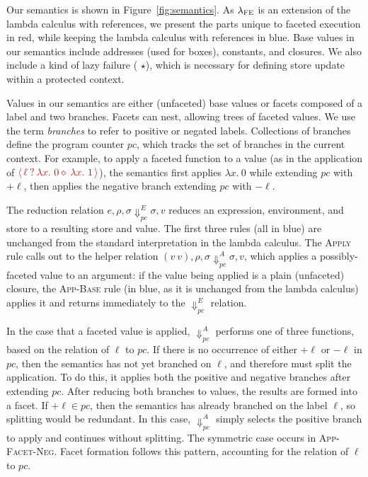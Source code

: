 \documentclass[review=true,acmlarge]{acmart}
\newcommand{\colorMATH}{black!20!blue}
\newcommand{\colorFAC}{black!20!red}
\newcommand{\blue}[1] {{\color{\colorMATH} #1}}
\newcommand{\fcol}[1] {{\color{\colorFAC} #1}}
\newcommand{\bmth}[1] {{\color{\colorMATH} $#1$}}
\newcommand{\rmth}[1] {{\color{\colorFAC} $#1$}}
\newcommand{\lang}[0]{$\lambda_\textsc{FE}$\xspace}
\newcommand{\facet}[3]{{\fcol{\ensuremath{\langle \, {#1} \: ? \: {#2} \diamond \: {#3} \, \rangle}}}}
\begin{document}
Our semantics is shown in Figure~\ref{fig:semantics}. As \lang is an
extension of the lambda calculus with references, we present the parts
unique to faceted execution in \fcol{red}, while keeping the lambda
calculus with references in \blue{blue}. Base values in our semantics
include addresses (used for boxes), constants, and closures. We also
include a kind of lazy failure (\bmth{\star}), which is necessary for
defining store update within a protected context.

Values in our semantics are either (unfaceted) base values or facets
composed of a label and two branches. Facets can nest, allowing trees
of faceted values. We use the term \emph{branches} to refer to
positive or negated labels. Collections of branches define the program
counter \rmth{pc}, which tracks the set of branches in the current
context. For example, to apply a faceted function to a value (as in
the application of \bmth{\facet{\ell}{\lambda x.~0}{\lambda x.~1}}),
the semantics first applies \bmth{\lambda x.~0} while extending \rmth{pc}
with \rmth{+\ell}, then applies the negative branch extending
\rmth{pc} with \rmth{-\ell}.

The reduction relation \bmth{e, \rho, \sigma \Downarrow_{pc}^E \sigma,
  v} reduces an expression, environment, and store to a resulting
store and value. The first three rules (all in blue) are unchanged
from the standard interpretation in the lambda calculus. The
\textsc{Apply} rule calls out to the helper relation \rmth{(v~v),
  \rho, \sigma \Downarrow_{pc}^A \sigma, v}, which applies a
possibly-faceted value to an argument: if the value being applied is a
plain (unfaceted) closure, the \textsc{App-Base} rule (in blue, as it
is unchanged from the lambda calculus) applies it and returns
immediately to the \bmth{\Downarrow_{pc}^E} relation.

In the case that a faceted value is applied, \rmth{\Downarrow_{pc}^A}
performs one of three functions, based on the relation of \rmth{\ell}
to \rmth{pc}. If there is no occurrence of either \rmth{+\ell} or
\rmth{-\ell} in \rmth{pc}, then the semantics has not yet branched on
\rmth{\ell}, and therefore must split the application. To do this, it
applies both the positive and negative branches after extending
\rmth{pc}. After reducing both branches to values, the results are
formed into a facet. If \rmth{+\ell \in pc}, then the semantics has
already branched on the label \rmth{\ell}, so splitting would be
redundant. In this case, \rmth{\Downarrow_{pc}^A} simply selects the
positive branch to apply and continues without splitting. The
symmetric case occurs in \textsc{App-Facet-Neg}. Facet formation
follows this pattern, accounting for the relation of \rmth{\ell} to
\rmth{pc}.
\end{document}
